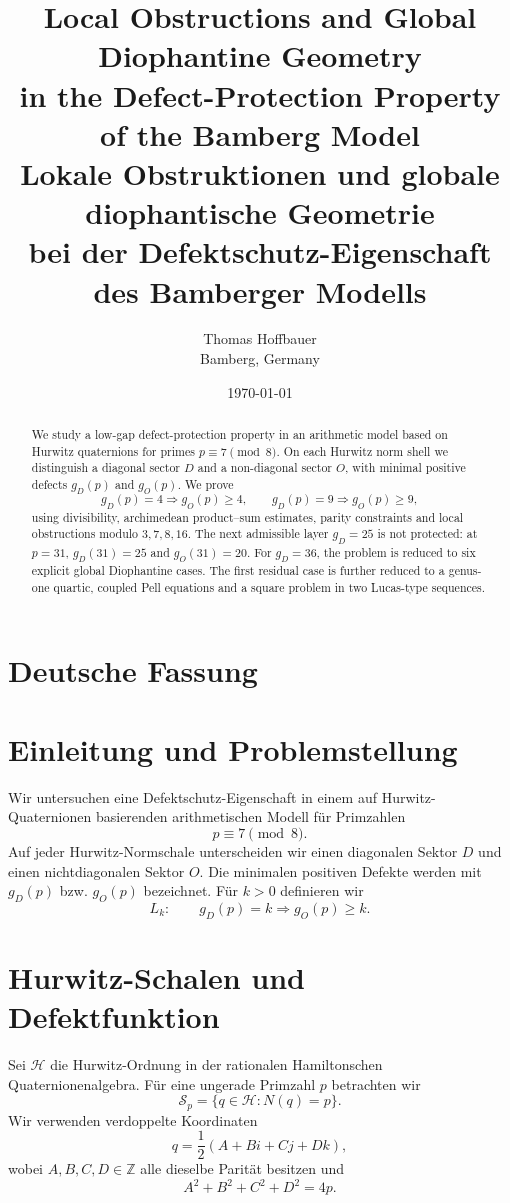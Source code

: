 \documentclass[11pt,a4paper]{article}
\title{\textbf{Local Obstructions and Global Diophantine Geometry\\
in the Defect-Protection Property of the Bamberg Model}\\[0.4em]
\large Lokale Obstruktionen und globale diophantische Geometrie\\
bei der Defektschutz-Eigenschaft des Bamberger Modells}
\author{Thomas Hoffbauer\\Bamberg, Germany}
\date{\today}
\theoremstyle{definition}
\newcommand{\Hur}{\mathcal H}
\newcommand{\Sp}{\mathcal S_p}
\newcommand{\Z}{\mathbb Z}
\begin{document}
\maketitle

\begin{abstract}
We study a low-gap defect-protection property in an arithmetic model based on Hurwitz quaternions for primes \(p\equiv7\pmod8\). On each Hurwitz norm shell we distinguish a diagonal sector \(D\) and a non-diagonal sector \(O\), with minimal positive defects \(g_D(p)\) and \(g_O(p)\). We prove
\[
g_D(p)=4\Longrightarrow g_O(p)\ge4,\qquad
g_D(p)=9\Longrightarrow g_O(p)\ge9,
\]
using divisibility, archimedean product--sum estimates, parity constraints and local obstructions modulo \(3,7,8,16\). The next admissible layer \(g_D=25\) is not protected: at \(p=31\), \(g_D(31)=25\) and \(g_O(31)=20\). For \(g_D=36\), the problem is reduced to six explicit global Diophantine cases. The first residual case is further reduced to a genus-one quartic, coupled Pell equations and a square problem in two Lucas-type sequences.
\end{abstract}

\section*{Deutsche Fassung}

\section{Einleitung und Problemstellung}
Wir untersuchen eine Defektschutz-Eigenschaft in einem auf Hurwitz-Quaternionen basierenden arithmetischen Modell für Primzahlen
\[
p\equiv7\pmod8.
\]
Auf jeder Hurwitz-Normschale unterscheiden wir einen diagonalen Sektor \(D\) und einen nichtdiagonalen Sektor \(O\). Die minimalen positiven Defekte werden mit \(g_D(p)\) bzw. \(g_O(p)\) bezeichnet. Für \(k>0\) definieren wir
\[
L_k:\qquad g_D(p)=k\Longrightarrow g_O(p)\ge k.
\]

\section{Hurwitz-Schalen und Defektfunktion}
Sei \(\Hur\) die Hurwitz-Ordnung in der rationalen Hamiltonschen Quaternionenalgebra. Für eine ungerade Primzahl \(p\) betrachten wir
\[
\Sp=\{q\in\Hur:N(q)=p\}.
\]
Wir verwenden verdoppelte Koordinaten
\[
q=\frac12(A+Bi+Cj+Dk),
\]
wobei \(A,B,C,D\in\Z\) alle dieselbe Parität besitzen und
\[
A^2+B^2+C^2+D^2=4p.
\]
\end{document}
